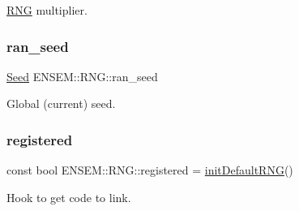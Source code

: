 \mbox{\hyperlink{namespaceENSEM_1_1RNG}{R\+NG}} multiplier. 

\mbox{\label{namespaceENSEM_1_1RNG_a3d617978a554c127dc164947d602b288}} 
\subsubsection{\texorpdfstring{ran\_seed}{ran\_seed}}
{\footnotesize\ttfamily \mbox{\hyperlink{group__defs_ga8a5a983ab64ca8f6a5419885bacd4c40}{Seed}} E\+N\+S\+E\+M\+::\+R\+N\+G\+::ran\+\_\+seed}



Global (current) seed. 

\mbox{\label{namespaceENSEM_1_1RNG_ac792bd2933a030bd73c2ffd2d289cc53}} 
\subsubsection{\texorpdfstring{registered}{registered}}
{\footnotesize\ttfamily const bool E\+N\+S\+E\+M\+::\+R\+N\+G\+::registered = \mbox{\hyperlink{namespaceENSEM_1_1RNG_a4a7ec2d430ab092440b9c3b2b5fd9e64}{init\+Default\+R\+NG}}()}



Hook to get code to link. 


